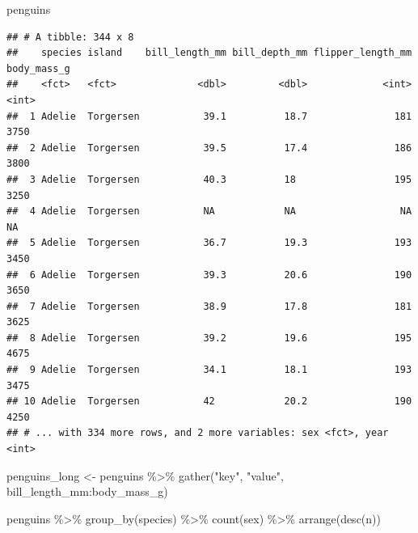 \documentclass[
]{book}
\newenvironment{Shaded}{\begin{snugshade}}{\end{snugshade}}
\newcommand{\FunctionTok}[1]{\textcolor[rgb]{0.00,0.00,0.00}{#1}}
\newcommand{\NormalTok}[1]{#1}
\newcommand{\OtherTok}[1]{\textcolor[rgb]{0.56,0.35,0.01}{#1}}
\newcommand{\SpecialCharTok}[1]{\textcolor[rgb]{0.00,0.00,0.00}{#1}}
\newcommand{\StringTok}[1]{\textcolor[rgb]{0.31,0.60,0.02}{#1}}
\begin{document}
\begin{Shaded}
\begin{Highlighting}[]
\NormalTok{penguins}
\end{Highlighting}
\end{Shaded}

\begin{verbatim}
## # A tibble: 344 x 8
##    species island    bill_length_mm bill_depth_mm flipper_length_mm body_mass_g
##    <fct>   <fct>              <dbl>         <dbl>             <int>       <int>
##  1 Adelie  Torgersen           39.1          18.7               181        3750
##  2 Adelie  Torgersen           39.5          17.4               186        3800
##  3 Adelie  Torgersen           40.3          18                 195        3250
##  4 Adelie  Torgersen           NA            NA                  NA          NA
##  5 Adelie  Torgersen           36.7          19.3               193        3450
##  6 Adelie  Torgersen           39.3          20.6               190        3650
##  7 Adelie  Torgersen           38.9          17.8               181        3625
##  8 Adelie  Torgersen           39.2          19.6               195        4675
##  9 Adelie  Torgersen           34.1          18.1               193        3475
## 10 Adelie  Torgersen           42            20.2               190        4250
## # ... with 334 more rows, and 2 more variables: sex <fct>, year <int>
\end{verbatim}

\begin{Shaded}
\begin{Highlighting}[]
\NormalTok{penguins\_long }\OtherTok{\textless{}{-}}\NormalTok{ penguins }\SpecialCharTok{\%\textgreater{}\%}
  \FunctionTok{gather}\NormalTok{(}\StringTok{"key"}\NormalTok{, }\StringTok{"value"}\NormalTok{, bill\_length\_mm}\SpecialCharTok{:}\NormalTok{body\_mass\_g)}
\end{Highlighting}
\end{Shaded}

\begin{Shaded}
\begin{Highlighting}[]
\NormalTok{penguins }\SpecialCharTok{\%\textgreater{}\%}
  \FunctionTok{group\_by}\NormalTok{(species) }\SpecialCharTok{\%\textgreater{}\%}
  \FunctionTok{count}\NormalTok{(sex) }\SpecialCharTok{\%\textgreater{}\%}
  \FunctionTok{arrange}\NormalTok{(}\FunctionTok{desc}\NormalTok{(n))}
\end{Highlighting}
\end{Shaded}
\end{document}
